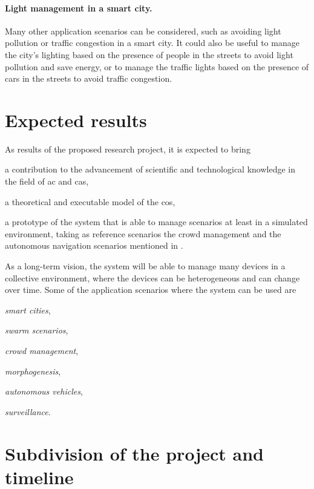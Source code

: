 \documentclass[12pt, a4paper]{article}
\newenvironment{inlinelist}{\begin{enumerate*}[label=\emph{(\roman*)}]}{\end{enumerate*}}
\begin{document}
\sloppypar
\paragraph{Light management in a smart city.}
Many other application scenarios can be considered,
such as avoiding light pollution or traffic congestion in a smart city.
%
It could also be useful to manage the city's lighting based on the presence of people in the streets to avoid light pollution and save energy,
or to manage the traffic lights based on the presence of cars in the streets to avoid traffic congestion.

\section{Expected results}
\label{sec:expected-results}

As results of the proposed research project,
it is expected to bring
\begin{inlinelist}
    \item a contribution to the advancement of scientific and technological knowledge in the field of \ac{ac} and \ac{cas},
    \item a theoretical and executable model of the \ac{cos},
    \item a prototype of the system that is able to manage scenarios at least in a simulated environment,
    taking as reference scenarios the crowd management and the autonomous navigation scenarios mentioned in .
\end{inlinelist}

As a long-term vision,
the system will be able to manage many devices in a collective environment,
where the devices can be heterogeneous and can change over time.
%
Some of the application scenarios where the system can be used are
\begin{inlinelist}
    \item \emph{smart cities},
    \item \emph{swarm scenarios},
    \item \emph{crowd management},
    \item \emph{morphogenesis},
    \item \emph{autonomous vehicles},
    \item \emph{surveillance}.
\end{inlinelist}

\section{Subdivision of the project and timeline}
\label{sec:subdivision-of-the-project-and-timeline}
\end{document}
